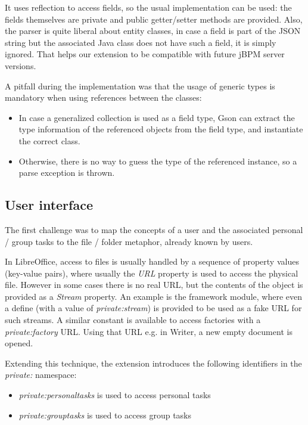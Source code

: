 It uses reflection to access fields, so the usual implementation can
be used: the fields themselves are private and public getter/setter methods are
provided. Also, the parser is quite liberal about entity classes, in case a
field is part of the JSON string but the associated Java class does not have
such a field, it is simply ignored. That helps our extension to be compatible
with future jBPM server versions.

A pitfall during the implementation was that the usage of generic types is
mandatory when using references between the classes:

\begin{itemize}
\item In case a generalized collection is used as a field type, Gson can extract the type information of the referenced objects from the field type, and instantiate the correct class.
\item Otherwise, there is no way to guess the type of the referenced instance, so a parse exception is thrown.
\end{itemize}

\subsection{User interface}

The first challenge was to map the concepts of a user and the associated
personal / group tasks to the file / folder metaphor, already known by users.

In LibreOffice, access to files is usually handled by a sequence of property
values (key-value pairs), where usually the \emph{URL} property is used to
access the physical file. However in some cases there is no real URL, but the
contents of the object is provided as a \emph{Stream} property.  An example is
the framework module\cite{lo-framework-module}, where even a define (with a
value of \emph{private:stream}) is provided to be used as a fake URL for such
streams.  A similar constant is available to access factories with a
\emph{private:factory} URL. Using that URL e.g. in Writer, a new empty document
is opened.

Extending this technique, the extension introduces the following identifiers in
the \emph{private:} namespace:

\begin{itemize}
\item \emph{private:personaltasks} is used to access personal tasks
\item \emph{private:grouptasks} is used to access group tasks
\end{itemize}

